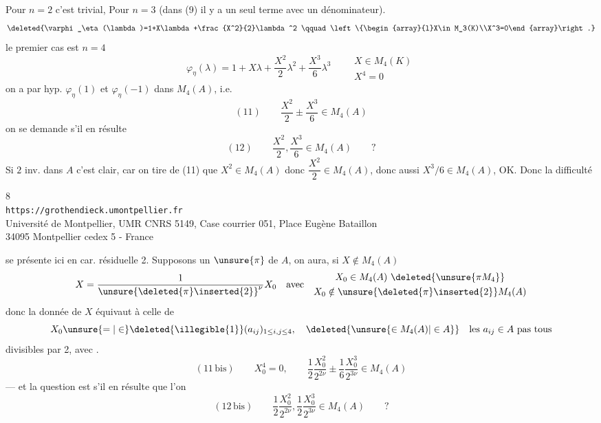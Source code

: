 Pour $n=2$ c'est trivial, Pour $n=3$ \uline{}
(dans (9) il y a un seul terme avec un dénominateur).
\[
\deleted{\varphi_\eta(\lambda)=1+X\lambda+\frac{X^2}{2}\lambda^2
\qquad\left\{\begin{array}{l}X\in M_3(K)\\X^3=0\end{array}\right.}
\]
le premier cas  est $n=4$
\[
\varphi_\eta(\lambda)=1+X\lambda+\frac{X^2}{2}\lambda^2+
\frac{X^3}{6}\lambda^3
\qquad\begin{array}{l}X\in M_4(K)\\X^4=0\end{array}
\]
on a par hyp. $\varphi_\eta(1)$ et $\varphi_\eta(-1)$ dans $M_4(A)$,
i.e.
\[
(11)\qquad \frac{X^2}{2}\mathbin{\pm}\frac{X^3}{6}\in M_4(A)
\]
on se demande s'il en résulte
\[
(12)\qquad \frac{X^2}{2},\frac{X^3}{6}\in M_4(A)\qquad ?
\]
Si $2$ inv. dans $A$ c'est clair, car on tire de (11) que $X^2\in M_4(A)$
donc $\dfrac{X^2}{2}\in M_4(A)$, donc aussi $X^3/6\in M_4(A)$, OK.
Donc la difficulté

\begin{center}
\small
8\\
\texttt{https://grothendieck.umontpellier.fr}\\
Université de Montpellier, UMR CNRS 5149, Case courrier 051, Place Eugène Bataillon\\
34095 Montpellier cedex 5 - France
\end{center}
se présente ici en car. résiduelle 2.  Supposons \deleted{\unsure{$\pi$}}  un  $\unsure{\pi}$ de $A$, on aura, si $X\notin M_4(A)$
\[
X=\frac{1}{\unsure{\deleted{\pi}\inserted{2}}^{\nu}}X_0
\quad\text{avec}\quad
\begin{gathered}
X_0\in M_4(A)\ \deleted{\unsure{\pi M_4}}\\
X_0\notin \unsure{\deleted{\pi}\inserted{2}}M_4(A)
\end{gathered}
\]
donc  la donnée de $X$ équivaut à celle de
\[
X_0\unsure{=|\in}\deleted{\illegible{1}}(a_{ij})_{1\leq i,j\leq4},\quad
\deleted{\unsure{\in M_4(A)|\in A}}\quad\text{les }a_{ij}\in A\text{ pas tous}
\]
divisibles par 2, avec .
\[
(11\,\text{bis})\qquad X_0^4=0,\qquad
\frac12\frac{X_0^2}{2^{2\nu}}\pm\frac16\frac{X_0^3}{2^{3\nu}}\in M_4(A)
\]
--- et la question est s'il en résulte que l'on 
\[
(12\,\text{bis})\qquad
\frac12\frac{X_0^2}{2^{2\nu}},\frac12\frac{X_0^3}{2^{3\nu}}\in M_4(A)\qquad ?
\]

